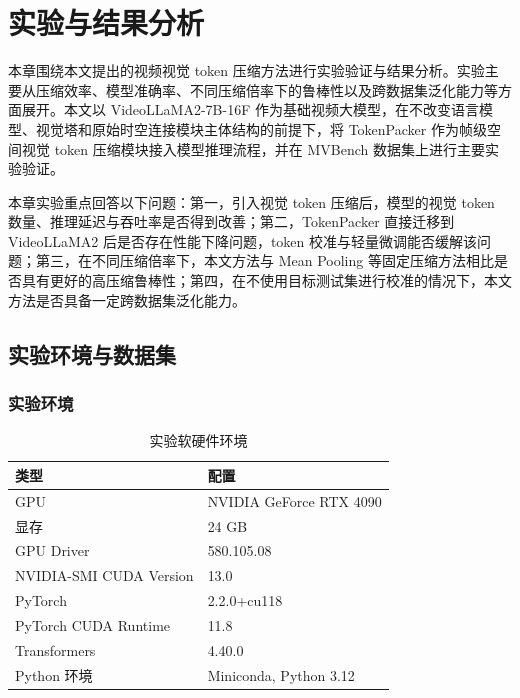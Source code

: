 \cleardoublepage

\section{实验与结果分析}

本章围绕本文提出的视频视觉 token 压缩方法进行实验验证与结果分析。实验主要从压缩效率、模型准确率、不同压缩倍率下的鲁棒性以及跨数据集泛化能力等方面展开。本文以 VideoLLaMA2-7B-16F 作为基础视频大模型，在不改变语言模型、视觉塔和原始时空连接模块主体结构的前提下，将 TokenPacker 作为帧级空间视觉 token 压缩模块接入模型推理流程，并在 MVBench 数据集上进行主要实验验证\cite{videollama22024,mvbench2024,tokenpacker2024}。

本章实验重点回答以下问题：第一，引入视觉 token 压缩后，模型的视觉 token 数量、推理延迟与吞吐率是否得到改善；第二，TokenPacker 直接迁移到 VideoLLaMA2 后是否存在性能下降问题，token 校准与轻量微调能否缓解该问题；第三，在不同压缩倍率下，本文方法与 Mean Pooling 等固定压缩方法相比是否具有更好的高压缩鲁棒性；第四，在不使用目标测试集进行校准的情况下，本文方法是否具备一定跨数据集泛化能力。

\subsection{实验环境与数据集}

\subsubsection{实验环境}

\begin{table}[!htbp]
    \centering
    \caption{\label{tab:experiment_environment}实验软硬件环境}
    \begin{tabularx}{\textwidth}{lX}
        \toprule
        类型 & 配置 \\
        \midrule
        GPU & NVIDIA GeForce RTX 4090 \\
        显存 & 24 GB \\
        GPU Driver & 580.105.08 \\
        NVIDIA-SMI CUDA Version & 13.0 \\
        PyTorch & 2.2.0+cu118 \\
        PyTorch CUDA Runtime & 11.8 \\
        Transformers & 4.40.0 \\
        Python 环境 & Miniconda, Python 3.12 \\
        \bottomrule
    \end{tabularx}
\end{table}

